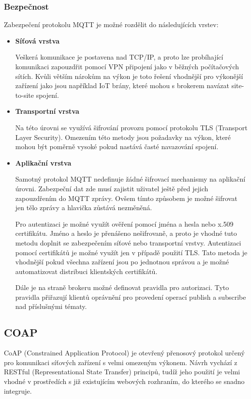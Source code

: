  \subsubsection{Bezpečnost}
 Zabezpečení protokolu MQTT je možné rozdělit do následujících vrstev:
 \begin{itemize}
  \item \textbf{Síťová vrstva}
  
    Veškerá komunikace je postavena nad TCP/IP, a proto lze probíhající komunikaci
    zapouzdřit pomocí VPN připojení
    jako v běžných počítačových sítích. Kvůli větším nárokům na výkon je toto
    řešení vhodnější pro výkonější zařízení jako jsou například IoT brány, které
    mohou s brokerem navázat site-to-site spojení. \cite{mqtt_sec}
    
  \item \textbf{Transportní vrstva}
  
  Na této úrovni se využívá šifrování provozu pomocí protokolu TLS (Transport
  Layer Security). Omezením této metody jsou požadavky na výkon, které mohou být
  poměrně vysoké pokud nastává časté navazování spojení. \cite{mqtt_sec}
  
  \item \textbf{Aplikační vrstva}
  
  Samotný protokol MQTT nedefinuje žádné šifrovací mechanismy na aplikační úrovni. 
  Zabezpeční dat zde musí zajistit uživatel ještě před jejich zapouzdřením do MQTT zprávy. 
  Ovšem tímto způsobem je možné šifrovat jen tělo zprávy a hlavička zůstává nezměněná.
  
  Pro autentizaci je možné využít ověření pomocí jména a hesla nebo x.509 certifikátu.
  Jméno a heslo je přenášeno nešifrovaně, a proto je vhodné tuto metodu doplnit se 
  zabezpečením síťové nebo transportní vrstvy. Autentizaci pomocí certifikátů 
  je možné využít jen v případě použití TLS. Tato metoda je vhodnější pokud všechna
  zařízení jsou po jednotnou správou a je možné automatizovat distribuci 
  klientských certifikátů.
  
  Dále je na straně brokeru možné definovat pravidla pro autorizaci. Tyto pravidla 
  přiřazují klientů oprávnění pro provedení operací publish a subscribe
  nad příslušnými tématy. \cite{mqtt_sec}
  
 \end{itemize}

  \subsection{COAP}
  CoAP (Constrained Application Protocol) je otevřený přenosový protokol určený pro
  komunikaci síťových zařízení s velmi omezeným výkonem. Návrh vychází z RESTful
  (Representational State Transfer) principů, tudíž jeho použití je velmi vhodné
  v prostředích s již existujícím webových rozhraním, do kterého se snadno integruje. \cite{coap}
  
